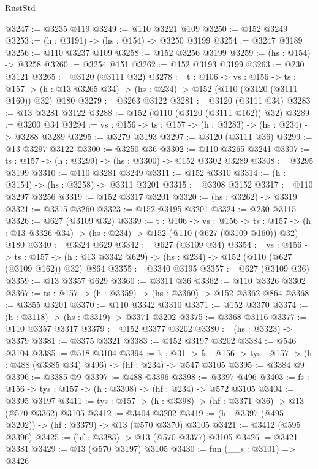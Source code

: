 \begin{lexlean}{RustStd}
\begin{coremodule}
@3247 := @3235 @119
@3249 := @110 @3221 @109
@3250 := @152 @3249
@3253 := (h : @3191) -> (hs : @154) -> @3250 @3199
@3254 := @3247 @3189
@3256 := @110 @3237 @109
@3258 := @152 @3256 @3199
@3259 := (hs : @154) -> @3258
@3260 := @3254 @151
@3262 := @152 @3193 @3199
@3263 := @230 @3121
@3265 := @3120 (@3111 @32)
@3278 := {t : @106} ->
  {vs : @156} ->
  {ts : @157} -> (h : @13 @3265 @34) -> (hs : @234) -> @152 (@110 (@3120 (@3111 @160)) @32) @180
@3279 := @3263 @3122
@3281 := @3120 (@3111 @34)
@3283 := @13 @3281 @3122
@3288 := @152 (@110 (@3120 (@3111 @162)) @32)
@3289 := @3200 @34
@3294 := {vs : @156} -> {ts : @157} -> (h : @3283) -> (hs : @234) -> @3288 @3289
@3295 := @3279 @3193
@3297 := @3120 (@3111 @36)
@3299 := @13 @3297 @3122
@3300 := @3250 @36
@3302 := @110 @3265 @3241
@3307 := {ts : @157} -> (h : @3299) -> (hs : @3300) -> @152 @3302 @3289
@3308 := @3295 @3199
@3310 := @110 @3281 @3249
@3311 := @152 @3310
@3314 := (h : @3154) -> (hs : @3258) -> @3311 @3201
@3315 := @3308 @3152
@3317 := @110 @3297 @3256
@3319 := @152 @3317 @3201
@3320 := (hs : @3262) -> @3319
@3321 := @3315 @3260
@3323 := @152 @3195 @3201
@3324 := @230 @3115
@3326 := @627 (@3109 @32)
@3339 := {t : @106} ->
  {vs : @156} ->
  {ts : @157} -> (h : @13 @3326 @34) -> (hs : @234) -> @152 (@110 (@627 (@3109 @160)) @32) @180
@3340 := @3324 @629
@3342 := @627 (@3109 @34)
@3354 := {vs : @156} ->
  {ts : @157} -> (h : @13 @3342 @629) -> (hs : @234) -> @152 (@110 (@627 (@3109 @162)) @32) @864
@3355 := @3340 @3195
@3357 := @627 (@3109 @36)
@3359 := @13 @3357 @629
@3360 := @3311 @36
@3362 := @110 @3326 @3302
@3367 := {ts : @157} -> (h : @3359) -> (hs : @3360) -> @152 @3362 @864
@3368 := @3355 @3201
@3370 := @110 @3342 @3310
@3371 := @152 @3370
@3374 := (h : @3118) -> (hs : @3319) -> @3371 @3202
@3375 := @3368 @3116
@3377 := @110 @3357 @3317
@3379 := @152 @3377 @3202
@3380 := (hs : @3323) -> @3379
@3381 := @3375 @3321
@3383 := @152 @3197 @3202
@3384 := @546 @3104
@3385 := @518 @3104
@3394 := {k : @31} ->
  {fs : @156} -> {tys : @157} -> (h : @488 (@3385 @34) @496) -> (hf : @234) -> @547 @3105
@3395 := @3384 @9
@3396 := @3385 @9
@3397 := @488 @3396
@3398 := @3397 @496
@3403 := {fs : @156} -> {tys : @157} -> (h : @3398) -> (hf : @234) -> @572 @3105
@3404 := @3395 @3197
@3411 := {tys : @157} -> (h : @3398) -> (hf : @3371 @36) -> @13 (@570 @3362) @3105
@3412 := @3404 @3202
@3419 := (h : @3397 (@495 @3202)) -> (hf : @3379) -> @13 (@570 @3370) @3105
@3421 := @3412 (@595 @3396)
@3425 := (hf : @3383) -> @13 (@570 @3377) @3105
@3426 := @3421 @3381
@3429 := @13 (@570 @3197) @3105
@3430 := fun (__s : @3101) => @3426

\end{coremodule}
\end{lexlean}
